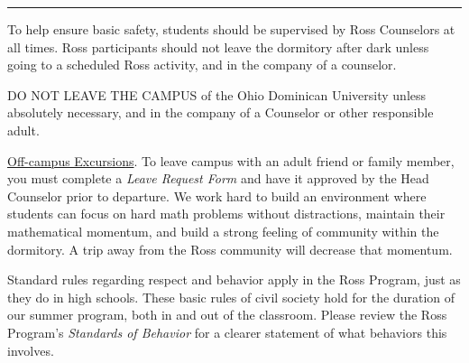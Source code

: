 \documentclass{ross}
\begin{document}
\bigskip\hrule
\pagebreak

To help ensure basic safety, students should be supervised 
by Ross Counselors at all times.
Ross participants should not leave the dormitory after dark unless going to a
scheduled Ross activity, and in the company of a counselor.

DO NOT LEAVE THE CAMPUS of the Ohio Dominican University unless \\
absolutely necessary, and in the company of a Counselor or other responsible adult.  

\underline{Off-campus Excursions}.  To leave campus with
an adult friend or family member, you must complete a {\it Leave Request Form} 
and have it approved by the Head Counselor prior to departure.
We work hard to build an environment where students can focus on hard math problems
without distractions, maintain their mathematical momentum,
 and build a strong feeling of community within the dormitory.  
 A trip away from the Ross community will decrease that momentum.

\bigskip

Standard rules regarding respect and behavior apply in the Ross
Program, just as they do in high schools. These basic rules of civil society hold 
for the duration of our summer program, both in and out of the classroom. 
Please review the Ross Program's \textit{Standards of Behavior} for
a clearer statement of what behaviors this involves.
\end{document}
